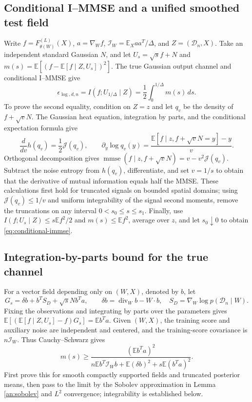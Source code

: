 \documentclass[a4paper]{tufte-handout}
\newcommand{\E}{\mathbb E}
\begin{document}
\begin{fullwidth}
\section{Conditional I--MMSE and a unified smoothed test field}\label{app:information}
Write $f=F_{\theta(W)}^{(L)}(X)$, $a=\nabla_Wf$,
$\mathcal I_W=\E_Xaa^T/\Delta$, and $Z=(\mathcal D_n,X)$.
Take an independent standard Gaussian $N$, and let $U_s=\sqrt sf+N$ and
$m(s)=\E[(f-\E[f\mid Z,U_s])^2]$. The true Gaussian output channel and conditional I--MMSE give
\begin{equation}\label{eq:conditional-immse}
 \epsilon_{\log,d,n}=I(f;U_{1/\Delta}\mid Z)
 =\frac12\int_0^{1/\Delta}m(s)\,ds.
\end{equation}
To prove the second equality, condition on $Z=z$ and let $q_v$ be the density of $f+\sqrt vN$.
The Gaussian heat equation, integration by parts, and the conditional expectation formula give
\[
 \frac d{dv}h(q_v)=\frac12\mathcal J(q_v),\qquad
 \partial_y\log q_v(y)=\frac{\E[f\mid z,f+\sqrt vN=y]-y}{v}.
\]
Orthogonal decomposition gives $\operatorname{mmse}(f\mid z,f+\sqrt vN)=v-v^2\mathcal J(q_v)$.
Subtract the noise entropy from $h(q_v)$, differentiate, and set $v=1/s$ to obtain that the derivative of mutual information equals half the MMSE.
These calculations first hold for truncated signals on bounded spatial domains; using $\mathcal J(q_v)\le1/v$
and uniform integrability of the signal second moments, remove the truncations on any interval $0<s_0\le s\le s_1$.
Finally, use $I(f;U_s\mid Z)\le s\E f^2/2$ and $m(s)\le\E f^2$,
average over $z$, and let $s_0\downarrow0$ to obtain \eqref{eq:conditional-immse}.

\subsection{Integration-by-parts bound for the true channel}
For a vector field depending only on $(W,X)$, denoted by $b$, let
\[
 G_s=\delta b+b^TS_D+\sqrt sN b^Ta,\qquad
 \delta b=\operatorname{div}_Wb-W\cdot b,\quad
 S_D=\nabla_W\log p(\mathcal D_n\mid W).
\]
Fixing the observations and integrating by parts over the parameters gives
$\E[(\E[f\mid Z,U_s]-f)G_s]=\E b^Ta$.
Given $(W,X)$, the training score and auxiliary noise are independent and centered, and the training-score covariance is
$n\mathcal I_W$. Thus Cauchy--Schwarz gives
\begin{equation}\label{eq:vt-mmse}
 m(s)\ge\frac{(\E b^Ta)^2}
 {n\E b^T\mathcal I_Wb+\E(\delta b)^2+s\E(b^Ta)^2}.
\end{equation}
First prove this for smooth compactly supported fields and truncated posterior means, then pass to the limit by the Sobolev approximation in Lemma \ref{an:sobolev} and $L^2$ convergence; integrability is established below.


\end{fullwidth}
\end{document}
